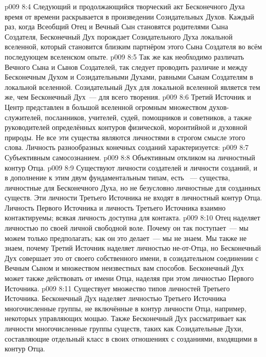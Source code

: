 \vs p009 8:4 Следующий и продолжающийся творческий акт Бесконечного Духа время от времени раскрывается в произведении Созидательных Духов. Каждый раз, когда Всеобщий Отец и Вечный Сын становятся родителями Сына Создателя, Бесконечный Дух порождает Созидательного Духа локальной вселенной, который становится близким партнёром этого Сына Создателя во всём последующем вселенском опыте.
\vs p009 8:5 Так же как необходимо различать Вечного Сына и Сынов Создателей, так следует проводить различие и между Бесконечным Духом и Созидательными Духами, равными Сынам Создателям в локальной вселенной. Созидательный Дух для локальной вселенной является тем же, чем Бесконечный Дух~--- для всего творения.
\vs p009 8:6 \pc Третий Источник и Центр представлен в большой вселенной огромным множеством духов\hyp{}служителей, посланников, учителей, судей, помощников и советников, а также руководителей определённых контуров физической, моронтийной и духовной природы. Не все эти существа являются личностями в строгом смысле этого слова. Личность разнообразных конечных созданий характеризуется:
\vs p009 8:7 Субъективным самосознанием.
\vs p009 8:8 Объективным откликом на личностный контур Отца.
\vs p009 8:9 \pc Существуют личности создателей и личности созданий, и в дополнение к этим двум фундаментальным типам, есть ~--- существа, личностные для Бесконечного Духа, но не безусловно личностные для созданных существ. Эти личности Третьего Источника не входят в личностный контур Отца. Личность Первого Источника и личность Третьего Источника взаимно контактируемы; всякая личность доступна для контакта.
\vs p009 8:10 \pc Отец наделяет личностью по своей личной свободной воле. Почему он так поступает~--- мы можем только предполагать; как он это делает~--- мы не знаем. Мы также не знаем, почему Третий Источник наделяет личностью не\hyp{}от\hyp{}Отца, но Бесконечный Дух совершает это от своего собственного имени, в созидательном соединении с Вечным Сыном и множеством неизвестных вам способов. Бесконечный Дух может также действовать от имени Отца, наделяя при этом личностью Первого Источника.
\vs p009 8:11 \pc Существует множество типов личностей Третьего Источника. Бесконечный Дух наделяет личностью Третьего Источника многочисленные группы, не включённые в контур личности Отца, например, некоторых управляющих мощью. Также Бесконечный Дух рассматривает как личности многочисленные группы существ, таких как Созидательные Духи, составляющие отдельный класс в своих отношениях с созданиями, входящими в контур Отца.
